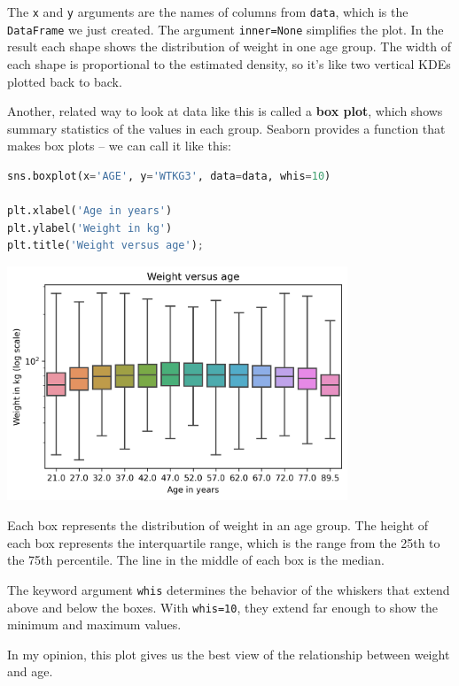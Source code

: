 The \passthrough{\lstinline!x!} and \passthrough{\lstinline!y!}
arguments are the names of columns from \passthrough{\lstinline!data!},
which is the \passthrough{\lstinline!DataFrame!} we just created. The
argument \passthrough{\lstinline!inner=None!} simplifies the plot. In
the result each shape shows the distribution of weight in one age group.
The width of each shape is proportional to the estimated density, so
it's like two vertical KDEs plotted back to back.

Another, related way to look at data like this is called a \textbf{box
plot}, which shows summary statistics of the values in each group.
Seaborn provides a function that makes box plots -- we can call it like
this:

\begin{lstlisting}[language=Python,style=source]
sns.boxplot(x='AGE', y='WTKG3', data=data, whis=10)

plt.xlabel('Age in years')
plt.ylabel('Weight in kg')
plt.title('Weight versus age');
\end{lstlisting}

\begin{center}
\includegraphics[width=4in]{chapters/09_relationships_files/09_relationships_46_0.png}
\end{center}

Each box represents the distribution of weight in an age group. The
height of each box represents the interquartile range, which is the
range from the 25th to the 75th percentile. The line in the middle of
each box is the median.

The keyword argument \passthrough{\lstinline!whis!} determines the
behavior of the whiskers that extend above and below the boxes. With
\passthrough{\lstinline!whis=10!}, they extend far enough to show the
minimum and maximum values.

In my opinion, this plot gives us the best view of the relationship
between weight and age.

